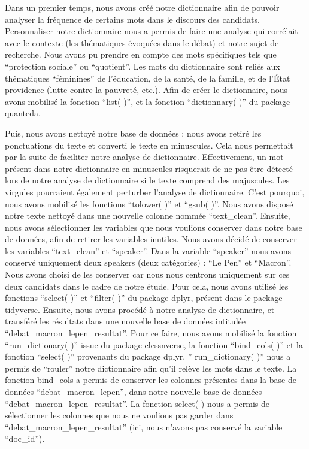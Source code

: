 \documentclass[
  letterpaper,
  DIV=11,
  numbers=noendperiod]{scrartcl}
\begin{document}
Dans un premier temps, nous avons créé notre dictionnaire afin de
pouvoir analyser la fréquence de certains mots dans le discours des
candidats. Personnaliser notre dictionnaire nous a permis de faire une
analyse qui corrélait avec le contexte (les thématiques évoquées dans le
débat) et notre sujet de recherche. Nous avons pu prendre en compte des
mots spécifiques tels que ``protection sociale'' ou ``quotient''. Les
mots du dictionnaire sont reliés aux thématiques ``féminines'' de
l'éducation, de la santé, de la famille, et de l'État providence (lutte
contre la pauvreté, etc.). Afin de créer le dictionnaire, nous avons
mobilisé la fonction ``list( )'', et la fonction ``dictionnary( )'' du
package quanteda.

Puis, nous avons nettoyé notre base de données : nous avons retiré les
ponctuations du texte et converti le texte en minuscules. Cela nous
permettait par la suite de faciliter notre analyse de dictionnaire.
Effectivement, un mot présent dans notre dictionnaire en minuscules
risquerait de ne pas être détecté lors de notre analyse de dictionnaire
si le texte comprend des majuscules. Les virgules pourraient également
perturber l'analyse de dictionnaire. C'est pourquoi, nous avons mobilisé
les fonctions ``tolower( )'' et ``gsub( )''. Nous avons disposé notre
texte nettoyé dans une nouvelle colonne nommée ``text\_clean''. Ensuite,
nous avons sélectionner les variables que nous voulions conserver dans
notre base de données, afin de retirer les variables inutiles. Nous
avons décidé de conserver les variables ``text\_clean'' et ``speaker''.
Dans la variable ``speaker'' nous avons conservé uniquement deux
speakers (deux catégories) : ``Le Pen'' et ``Macron''. Nous avons choisi
de les conserver car nous nous centrons uniquement sur ces deux
candidats dans le cadre de notre étude. Pour cela, nous avons utilisé
les fonctions ``select( )'' et ``filter( )'' du package dplyr, présent
dans le package tidyverse. Ensuite, nous avons procédé à notre analyse
de dictionnaire, et transféré les résultats dans une nouvelle base de
données intitulée ``debat\_macron\_lepen\_resultat''. Pour ce faire,
nous avons mobilisé la fonction ``run\_dictionary( )'' issue du package
clessnverse, la fonction ``bind\_cols( )'' et la fonction ``select( )''
provenants du package dplyr. '' run\_dictionary( )'' nous a permis de
``rouler'' notre dictionnaire afin qu'il relève les mots dans le texte.
La fonction bind\_cols a permis de conserver les colonnes présentes dans
la base de données ``debat\_macron\_lepen'', dans notre nouvelle base de
données ``debat\_macron\_lepen\_resultat''. La fonction select( ) nous a
permis de sélectionner les colonnes que nous ne voulions pas garder dans
``debat\_macron\_lepen\_resultat'' (ici, nous n'avons pas conservé la
variable ``doc\_id'').
\end{document}
